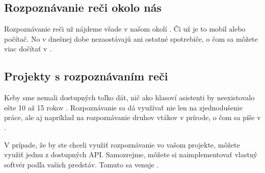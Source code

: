 \documentclass[a4paper, 11pt, hidelinks]{article}
\begin{document}
\subsection{Rozpoznávanie reči okolo nás}
Rozpoznávanie reči už nájdeme všade v našom okolí \cite{techHlasKom}. Či už je to mobil alebo počítač. No v dnešnej dobe nezaostávajú ani ostatné spotrebiče, o čom sa môžete viac dočítať v \cite{voiceRecInHome}.

\subsection{Projekty s rozpoznávaním reči}
Keby sme nemali dostupných toľko dát, nič ako hlasoví asistenti by neexistovalo ešte 10 až 15 rokov \cite{talkingToMachines}. Rozpoznávanie sa dá využívať nie len na zjednodušenie práce, ale aj napríklad na rozpoznávanie druhov vtákov v prírode, o čom sa píše v \cite{birdRecog}.

V prípade, že by ste chceli využiť rozpoznávanie vo vašom projekte, môžete využiť jednu z dostupných API. Samozrejme, môžete si naimplementovať vlastný softvér podľa vašich predstáv. Tomuto sa venuje \cite{howToDoSpeech}.

\newpage


\end{document}

